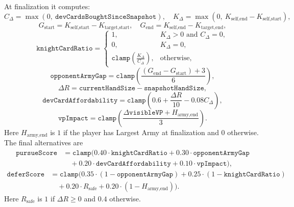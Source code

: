 \documentclass[letter,  12 pt]{article}
\begin{document}
At finalization it computes:
\[
C_{\Delta} = \max(0,\ \texttt{devCardsBoughtSinceSnapshot}),
\quad
K_{\Delta} = \max(0,\ K_{\text{self,end}} - K_{\text{self,start}}),
\]
\[
G_{\text{start}} = K_{\text{self,start}} - K_{\text{target,start}},
\quad
G_{\text{end}} = K_{\text{self,end}} - K_{\text{target,end}},
\]
\[
\texttt{knightCardRatio} =
\begin{cases}
1, & K_{\Delta}>0 \text{ and } C_{\Delta}=0,\\
0, & K_{\Delta}=0,\\
\texttt{clamp}\left(\frac{K_{\Delta}}{C_{\Delta}}\right), & \text{otherwise},
\end{cases}
\]
\[
\texttt{opponentArmyGap}
= \texttt{clamp}\left(\frac{(G_{\text{end}} - G_{\text{start}}) + 3}{6}\right),
\]
\[
\Delta R = \texttt{currentHandSize} - \texttt{snapshotHandSize},
\]
\[
\texttt{devCardAffordability}
= \texttt{clamp}\left(0.6 + \frac{\Delta R}{10} - 0.08C_{\Delta}\right),
\]
\[
\texttt{vpImpact}
= \texttt{clamp}\left(\frac{\Delta \texttt{visibleVP} + H_{\text{army,end}}}{3}\right).
\]
Here $H_{\text{army,end}}$ is $1$ if the player has Largest Army at finalization and $0$ otherwise.
The final alternatives are
\[
\begin{aligned}
\texttt{pursueScore}
&= \texttt{clamp}(
0.40 \cdot \texttt{knightCardRatio}
+ 0.30 \cdot \texttt{opponentArmyGap} \\
&\quad + 0.20 \cdot \texttt{devCardAffordability}
+ 0.10 \cdot \texttt{vpImpact}),
\end{aligned}
\]
\[
\begin{aligned}
\texttt{deferScore}
&= \texttt{clamp}\bigl(
0.35 \cdot (1 - \texttt{opponentArmyGap})
+ 0.25 \cdot (1 - \texttt{knightCardRatio}) \\
&\quad + 0.20 \cdot R_{\text{safe}}
+ 0.20 \cdot (1 - H_{\text{army,end}})\bigr).
\end{aligned}
\]
Here $R_{\text{safe}}$ is $1$ if $\Delta R \ge 0$ and $0.4$ otherwise.
\end{document}
